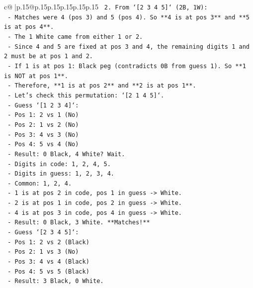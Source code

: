 \documentclass{article}
\begin{document}
{\begin{supertabular}{c@{$\;$}|p{.15\linewidth}@{}p{.15\linewidth}p{.15\linewidth}p{.15\linewidth}p{.15\linewidth}p{.15\linewidth}}
{{{\texttt{  2. From `{[}2 3 4 5{]}` (2B, 1W):} \\
\texttt{     {-} Matches were 4 (pos 3) and 5 (pos 4). So **4 is at pos 3** and **5 is at pos 4**.} \\
\texttt{     {-} The 1 White came from either 1 or 2.} \\
\texttt{     {-} Since 4 and 5 are fixed at pos 3 and 4, the remaining digits 1 and 2 must be at pos 1 and 2.} \\
\texttt{     {-} If 1 is at pos 1: Black peg (contradicts 0B from guess 1). So **1 is NOT at pos 1**.} \\
\texttt{     {-} Therefore, **1 is at pos 2** and **2 is at pos 1**.} \\
\texttt{     {-} Let's check this permutation: `{[}2 1 4 5{]}`.} \\
\texttt{       {-} Guess `{[}1 2 3 4{]}`:} \\
\texttt{         {-} Pos 1: 2 vs 1 (No)} \\
\texttt{         {-} Pos 2: 1 vs 2 (No)} \\
\texttt{         {-} Pos 3: 4 vs 3 (No)} \\
\texttt{         {-} Pos 4: 5 vs 4 (No)} \\
\texttt{         {-} Result: 0 Black, 4 White? Wait.} \\
\texttt{         {-} Digits in code: 1, 2, 4, 5.} \\
\texttt{         {-} Digits in guess: 1, 2, 3, 4.} \\
\texttt{         {-} Common: 1, 2, 4.} \\
\texttt{         {-} 1 is at pos 2 in code, pos 1 in guess {-}> White.} \\
\texttt{         {-} 2 is at pos 1 in code, pos 2 in guess {-}> White.} \\
\texttt{         {-} 4 is at pos 3 in code, pos 4 in guess {-}> White.} \\
\texttt{         {-} Result: 0 Black, 3 White. **Matches!**} \\
\texttt{       {-} Guess `{[}2 3 4 5{]}`:} \\
\texttt{         {-} Pos 1: 2 vs 2 (Black)} \\
\texttt{         {-} Pos 2: 1 vs 3 (No)} \\
\texttt{         {-} Pos 3: 4 vs 4 (Black)} \\
\texttt{         {-} Pos 4: 5 vs 5 (Black)} \\
\texttt{         {-} Result: 3 Black, 0 White.} \\
}}}
\end{supertabular}}
\end{document}
